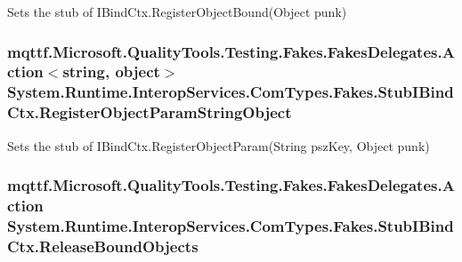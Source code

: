 Sets the stub of I\-Bind\-Ctx.\-Register\-Object\-Bound(\-Object punk)

\hypertarget{class_system_1_1_runtime_1_1_interop_services_1_1_com_types_1_1_fakes_1_1_stub_i_bind_ctx_a38240b00ccf71024570d4abdd3c19a7b}{
\subsubsection[{Register\-Object\-Param\-String\-Object}]{\setlength{\rightskip}{0pt plus 5cm}mqttf.\-Microsoft.\-Quality\-Tools.\-Testing.\-Fakes.\-Fakes\-Delegates.\-Action$<$string, object$>$ System.\-Runtime.\-Interop\-Services.\-Com\-Types.\-Fakes.\-Stub\-I\-Bind\-Ctx.\-Register\-Object\-Param\-String\-Object}}\label{class_system_1_1_runtime_1_1_interop_services_1_1_com_types_1_1_fakes_1_1_stub_i_bind_ctx_a38240b00ccf71024570d4abdd3c19a7b}


Sets the stub of I\-Bind\-Ctx.\-Register\-Object\-Param(\-String psz\-Key, Object punk)

\hypertarget{class_system_1_1_runtime_1_1_interop_services_1_1_com_types_1_1_fakes_1_1_stub_i_bind_ctx_a9ba119c678da92bd1046d69ec0ec36cd}{
\subsubsection[{Release\-Bound\-Objects}]{\setlength{\rightskip}{0pt plus 5cm}mqttf.\-Microsoft.\-Quality\-Tools.\-Testing.\-Fakes.\-Fakes\-Delegates.\-Action System.\-Runtime.\-Interop\-Services.\-Com\-Types.\-Fakes.\-Stub\-I\-Bind\-Ctx.\-Release\-Bound\-Objects}}\label{class_system_1_1_runtime_1_1_interop_services_1_1_com_types_1_1_fakes_1_1_stub_i_bind_ctx_a9ba119c678da92bd1046d69ec0ec36cd}


